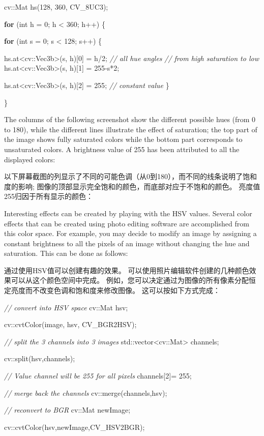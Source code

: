 \documentclass[]{article}
\newenvironment{Shaded}{}{}
\newcommand{\BuiltInTok}[1]{#1}
\newcommand{\CommentTok}[1]{\textcolor[rgb]{0.38,0.63,0.69}{\textit{#1}}}
\newcommand{\ControlFlowTok}[1]{\textcolor[rgb]{0.00,0.44,0.13}{\textbf{#1}}}
\newcommand{\DataTypeTok}[1]{\textcolor[rgb]{0.56,0.13,0.00}{#1}}
\newcommand{\DecValTok}[1]{\textcolor[rgb]{0.25,0.63,0.44}{#1}}
\newcommand{\NormalTok}[1]{#1}
\begin{document}
\begin{Shaded}
\begin{Highlighting}[]
\NormalTok{cv::Mat hs(}\DecValTok{128}\NormalTok{, }\DecValTok{360}\NormalTok{, CV_8UC3);
}
\ControlFlowTok{for}\NormalTok{ (}\DataTypeTok{int}\NormalTok{ h = }\DecValTok{0}\NormalTok{; h < }\DecValTok{360}\NormalTok{; h++) \{
}
    \ControlFlowTok{for}\NormalTok{ (}\DataTypeTok{int}\NormalTok{ s = }\DecValTok{0}\NormalTok{; s < }\DecValTok{128}\NormalTok{; s++) \{
}
\NormalTok{        hs.at<cv::Vec3b>(s, h)[}\DecValTok{0}\NormalTok{] = h/}\DecValTok{2}\NormalTok{; }\CommentTok{// all hue angles
}
        \CommentTok{// from high saturation to low
}
\NormalTok{        hs.at<cv::Vec3b>(s, h)[}\DecValTok{1}\NormalTok{] = }\DecValTok{255}\NormalTok{-s*}\DecValTok{2}\NormalTok{;
}
\NormalTok{        hs.at<cv::Vec3b>(s, h)[}\DecValTok{2}\NormalTok{] = }\DecValTok{255}\NormalTok{; }\CommentTok{// constant value
}
\NormalTok{    \}
}
\NormalTok{\}}
\end{Highlighting}
\end{Shaded}

The columns of the following screenshot show the different possible hues
(from 0 to 180), while the different lines illustrate the effect of
saturation; the top part of the image shows fully saturated colors while
the bottom part corresponds to unsaturated colors. A brightness value of
255 has been attributed to all the displayed colors:

以下屏幕截图的列显示了不同的可能色调（从0到180），而不同的线条说明了饱和度的影响;
图像的顶部显示完全饱和的颜色，而底部对应于不饱和的颜色。
亮度值255归因于所有显示的颜色：

Interesting effects can be created by playing with the HSV values.
Several color effects that can be created using photo editing software
are accomplished from this color space. For example, you may decide to
modify an image by assigning a constant brightness to all the pixels of
an image without changing the hue and saturation. This can be done as
follows:

通过使用HSV值可以创建有趣的效果。
可以使用照片编辑软件创建的几种颜色效果可以从这个颜色空间中完成。
例如，您可以决定通过为图像的所有像素分配恒定亮度而不改变色调和饱和度来修改图像。
这可以按如下方式完成：

\begin{Shaded}
\begin{Highlighting}[]
\CommentTok{// convert into HSV space
}
\NormalTok{cv::Mat hsv;
}
\NormalTok{cv::cvtColor(image, hsv, CV_BGR2HSV);
}
\CommentTok{// split the 3 channels into 3 images
}
\BuiltInTok{std::}\NormalTok{vector<cv::Mat> channels;
}
\NormalTok{cv::split(hsv,channels);
}
\CommentTok{// Value channel will be 255 for all pixels
}
\NormalTok{channels[}\DecValTok{2}\NormalTok{]= }\DecValTok{255}\NormalTok{;
}
\CommentTok{// merge back the channels
}
\NormalTok{cv::merge(channels,hsv);
}
\CommentTok{// reconvert to BGR
}
\NormalTok{cv::Mat newImage;
}
\NormalTok{cv::cvtColor(hsv,newImage,CV_HSV2BGR);}
\end{Highlighting}
\end{Shaded}
\end{document}
